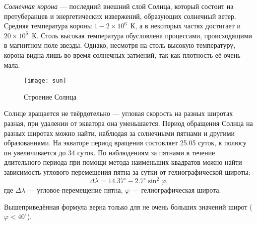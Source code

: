 \textit{Солнечная корона} --- последний внешний слой Солнца, который состоит из протуберанцев и энергетических  извержений, образующих солнечный ветер. Средняя температура короны $1-2\times10^6$~К, а в некоторых частях достигает  и $20\times10^6$~К. Столь высокая температура обусловлена процессами, происходящими в магнитном поле звезды. Однако, несмотря на столь высокую температуру, корона видна лишь во время солнечных затмений, так как плотность её очень мала.
  
  
  
\begin{figure}[h!]
\begin{center}
\texttt{[image: sun]}
\caption{Строение Солнца}
\end{center}
\end{figure}

Солнце вращается не твёрдотельно --- угловая скорость на разных широтах разная, при удалении от экватора она уменьшается. Период обращения Солнца на разных широтах можно найти, наблюдая за солнечными пятнами и другими образованиями. На экваторе период вращения состовляет 25.05 суток, к полюсу он увеличивается до 34 суток. По наблюдениям за пятнами в течение длительного периода при помощи метода наименьших квадратов можно найти зависимость углового перемещения пятна за сутки от гелиографической широты:
\begin{equation}
\Delta\lambda=14.37^{\circ}-2.7^{\circ}\sin^2\varphi,
\end{equation}
где $\Delta\lambda$ --- угловое перемещение пятна, $\varphi$ --- гелиографическая широта.

Вышеприведённая формула верна только для не очень больших значений широт ($\varphi<40^{\circ}$).